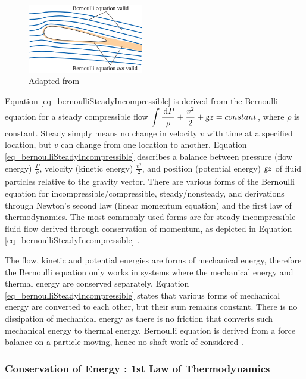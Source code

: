 \documentclass{article}
\newcommand{\ud}{\,\mathrm{d}}
\begin{document}
\begin{figure}[h!]
\centering
\includegraphics[width=0.45\textwidth]{./img/bermoulliInviscidRegions.png}
\caption{Adapted from \cite{White2011}}
\label{fig_bermoulliInviscidRegions}
\end{figure}

Equation \ref{eq_bernoulliSteadyIncompressible} is derived from the Bernoulli equation for a steady compressible flow $\displaystyle \int \frac{\ud P}{\rho} + \frac{v^2}{2} + \textsl{g} z = constant$, where $\rho$ is constant. Steady simply means no change in velocity $v$ with time at a specified location, but $v$ can change from one location to another. Equation \ref{eq_bernoulliSteadyIncompressible} describes a balance between pressure (flow energy) $\displaystyle \frac{P}{\rho}$, velocity (kinetic energy) $\displaystyle \frac{v^2}{2}$, and position (potential energy) $\textsl{g} z$ of fluid particles relative to the gravity vector. There are various forms of the Bernoulli equation for incompressible/compressible, steady/nonsteady, and derivations through Newton's second law (linear momentum equation) and the first law of thermodynamics. The most commonly used forms are for steady incompressible fluid flow derived through conservation of momentum, as depicted in Equation \ref{eq_bernoulliSteadyIncompressible} \cite{White2011}.

The flow, kinetic and potential energies are forms of mechanical energy, therefore the Bernoulli equation only works in systems where the mechanical energy and thermal energy are conserved separately. Equation \ref{eq_bernoulliSteadyIncompressible} states that various forms of mechanical energy are converted to each other, but their sum remains constant. There is no dissipation of mechanical energy as there is no friction that converts such mechanical energy to thermal energy. Bernoulli equation is derived from a force balance on a particle moving, hence no shaft work of considered \cite{White2011}.

\subsubsection*{Conservation of Energy : 1st Law of Thermodynamics}
\end{document}
